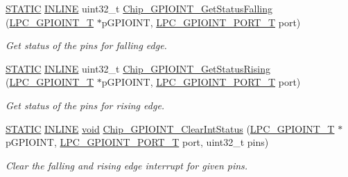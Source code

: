 \begin{DoxyCompactItemize}
\hyperlink{group__LPC__Types__Public__Macros_ga10b2d890d871e1489bb02b7e70d9bdfb}{S\-T\-A\-T\-I\-C} \hyperlink{group__LPC__Types__Public__Types_ga2eb6f9e0395b47b8d5e3eeae4fe0c116}{I\-N\-L\-I\-N\-E} uint32\-\_\-t \hyperlink{group__GPIOINT__17XX__40XX_gaa70fc03d17d6dd929249e435dcfb777b}{Chip\-\_\-\-G\-P\-I\-O\-I\-N\-T\-\_\-\-Get\-Status\-Falling} (\hyperlink{structLPC__GPIOINT__T}{L\-P\-C\-\_\-\-G\-P\-I\-O\-I\-N\-T\-\_\-\-T} $\ast$p\-G\-P\-I\-O\-I\-N\-T, \hyperlink{group__GPIOINT__17XX__40XX_ga41631ac5e33fde341c0afe680ded9fee}{L\-P\-C\-\_\-\-G\-P\-I\-O\-I\-N\-T\-\_\-\-P\-O\-R\-T\-\_\-\-T} port)
\begin{DoxyCompactList}\small\item\em Get status of the pins for falling edge. \end{DoxyCompactList}\item 
\hyperlink{group__LPC__Types__Public__Macros_ga10b2d890d871e1489bb02b7e70d9bdfb}{S\-T\-A\-T\-I\-C} \hyperlink{group__LPC__Types__Public__Types_ga2eb6f9e0395b47b8d5e3eeae4fe0c116}{I\-N\-L\-I\-N\-E} uint32\-\_\-t \hyperlink{group__GPIOINT__17XX__40XX_gad12bd25757ab3f58843afdb178548ef6}{Chip\-\_\-\-G\-P\-I\-O\-I\-N\-T\-\_\-\-Get\-Status\-Rising} (\hyperlink{structLPC__GPIOINT__T}{L\-P\-C\-\_\-\-G\-P\-I\-O\-I\-N\-T\-\_\-\-T} $\ast$p\-G\-P\-I\-O\-I\-N\-T, \hyperlink{group__GPIOINT__17XX__40XX_ga41631ac5e33fde341c0afe680ded9fee}{L\-P\-C\-\_\-\-G\-P\-I\-O\-I\-N\-T\-\_\-\-P\-O\-R\-T\-\_\-\-T} port)
\begin{DoxyCompactList}\small\item\em Get status of the pins for rising edge. \end{DoxyCompactList}\item 
\hyperlink{group__LPC__Types__Public__Macros_ga10b2d890d871e1489bb02b7e70d9bdfb}{S\-T\-A\-T\-I\-C} \hyperlink{group__LPC__Types__Public__Types_ga2eb6f9e0395b47b8d5e3eeae4fe0c116}{I\-N\-L\-I\-N\-E} \hyperlink{Paradigm_2Tern__EE_2small_2portmacro_8h_a14d32f8130d3c0b212cfc751730b5b49}{void} \hyperlink{group__GPIOINT__17XX__40XX_ga900d1ac0c053f80c19fc01ae7fc5d981}{Chip\-\_\-\-G\-P\-I\-O\-I\-N\-T\-\_\-\-Clear\-Int\-Status} (\hyperlink{structLPC__GPIOINT__T}{L\-P\-C\-\_\-\-G\-P\-I\-O\-I\-N\-T\-\_\-\-T} $\ast$p\-G\-P\-I\-O\-I\-N\-T, \hyperlink{group__GPIOINT__17XX__40XX_ga41631ac5e33fde341c0afe680ded9fee}{L\-P\-C\-\_\-\-G\-P\-I\-O\-I\-N\-T\-\_\-\-P\-O\-R\-T\-\_\-\-T} port, uint32\-\_\-t pins)
\begin{DoxyCompactList}\small\item\em Clear the falling and rising edge interrupt for given {\itshape pins}. \end{DoxyCompactList}\item 

\end{DoxyCompactItemize}
